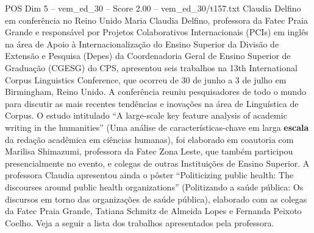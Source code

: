 \begin{textsample}{POS Dim 5 – vem\_ed\_30 – Score 2.00 – vem\_ed\_30/t157.txt}  \label{ex:f5_pos_034}
Claudia Delfino em conferência no Reino Unido Maria Claudia Delfino, professora da Fatec Praia Grande e responsável por Projetos Colaborativos Internacionais (PCIs) em inglês na área de Apoio à Internacionalização do Ensino Superior da Divisão de Extensão e Pesquisa (Depes) da Coordenadoria Geral de Ensino Superior de Graduação (CGESG) do CPS, apresentou seis trabalhos na 13th International Corpus Linguistics Conference, que ocorreu de 30 de junho a 3 de julho em Birmingham, Reino Unido.
A conferência reuniu pesquisadores de todo o mundo para discutir as mais recentes tendências e inovações na área de Linguística de Corpus.
O estudo intitulado “A large-scale key feature analysis of academic writing in the humanities” (Uma análise de características-chave em larga \textbf{escala} da redação acadêmica em ciências humanas), foi elaborado em coautoria com Marilisa Shimazumi, professora da Fatec Zona Leste, que também participou presencialmente no evento, e colegas de outras Instituições de Ensino Superior.
A professora Claudia apresentou ainda o pôster “Politicizing public health: The discourses around public health organizations” (Politizando a saúde pública: Os discursos em torno das organizações de saúde pública), elaborado com as colegas da Fatec Praia Grande, Tatiana Schmitz de Almeida Lopes e Fernanda Peixoto Coelho.
Veja a seguir a lista dos trabalhos apresentados pela professora.

\end{textsample}
